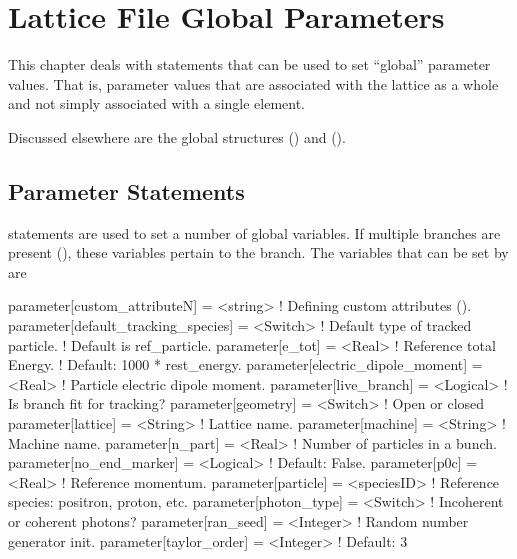 \chapter{Lattice File Global Parameters}

This chapter deals with statements that can be used to set ``global'' parameter values. That is,
parameter values that are associated with the lattice as a whole and not simply associated with a
single element.

Discussed elsewhere are the global structures ()  
and  ().

\section{Parameter Statements}
\label{s:param}


 statements are used to set a number of global variables.  If multiple branches are
present (), these variables pertain to the  branch. The variables that
can be set by  are
\begin{example}
  parameter[custom_attributeN]        = <string>    ! Defining custom attributes ().
  parameter[default_tracking_species] = <Switch>    ! Default type of tracked particle. 
                                                    !    Default is ref_particle.
  parameter[e_tot]                    = <Real>      ! Reference total Energy. 
                                                    !      Default: 1000 * rest_energy.
  parameter[electric_dipole_moment]   = <Real>      ! Particle electric dipole moment.
  parameter[live_branch]              = <Logical>   ! Is branch fit for tracking?
  parameter[geometry]                 = <Switch>    ! Open or closed
  parameter[lattice]                  = <String>    ! Lattice name.
  parameter[machine]                  = <String>    ! Machine name.
  parameter[n_part]                   = <Real>      ! Number of particles in a bunch.
  parameter[no_end_marker]            = <Logical>   ! Default: False.
  parameter[p0c]                      = <Real>      ! Reference momentum.
  parameter[particle]                 = <speciesID> ! Reference species: positron, proton, etc.
  parameter[photon_type]              = <Switch>    ! Incoherent or coherent photons?
  parameter[ran_seed]                 = <Integer>   ! Random number generator init.
  parameter[taylor_order]             = <Integer>   ! Default: 3
\end{example}

